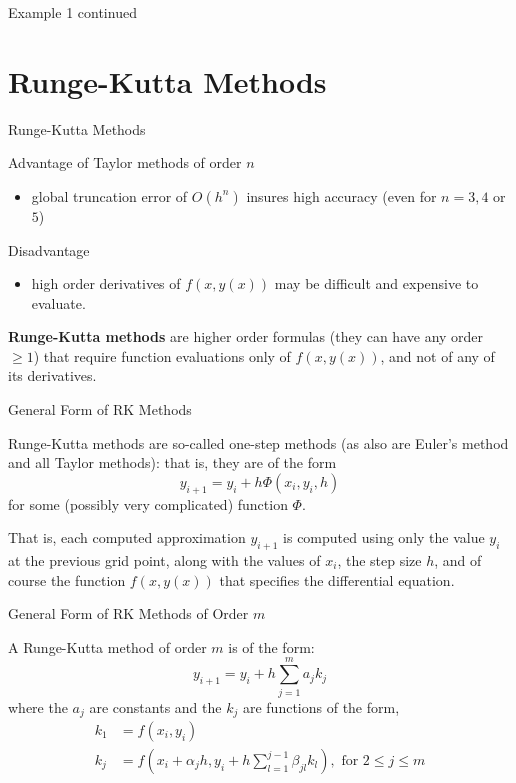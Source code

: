 \documentclass[12pt]{beamer}
\begin{document}
\begin{frame}{Example 1 continued}

\end{frame}

\section{Runge-Kutta Methods}

\begin{frame}{Runge-Kutta Methods} 

Advantage of Taylor methods of order $n$
\begin{itemize}
\item{global truncation error of $O(h^n)$ insures high accuracy (even for $n = 3, 4$ or $5$)}
\end{itemize}
Disadvantage
\begin{itemize}
\item{high order derivatives of $f(x,y(x))$ may be difficult and expensive to evaluate.}
\end{itemize}
\vspace{\baselineskip}
{\bf Runge-Kutta methods} are higher order formulas (they can have any order $\geq 1$) that require function evaluations only of  $f(x,y(x))$, and not of any of its derivatives.

\end{frame} 

\begin{frame}{General Form of RK Methods} 

Runge-Kutta methods are so-called one-step methods (as also are Euler’s method and all Taylor methods): that is, they are of the form
\[
y_{i+1}=y_i+h\Phi(x_i,y_i,h)
\]
for some (possibly very complicated) function $\Phi$.  

That is, each computed approximation $y_{i+1}$ is computed using only the value $y_i$ at the previous grid point, along with the values of $x_i$, the step size $h$, and of course the function $f(x,y(x))$ that specifies the differential equation.

\end{frame} 

\begin{frame}{General Form of RK Methods of Order $m$} 

A Runge-Kutta method of order $m$ is of the form:
\[
y_{i+1}=y_i+h\sum_{j=1}^m a_jk_j
\]
where the $a_j$ are constants and the $k_j$ are functions of the form,
\begin{align*}
k_1&=f(x_i,y_i) \\
k_j&=f(x_i+\alpha_jh,y_i+h\sum_{l=1}^{j-1}\beta_{jl}k_l), \text{ for } 2 \leq j \leq m
\end{align*}
\end{frame} 
\end{document}
